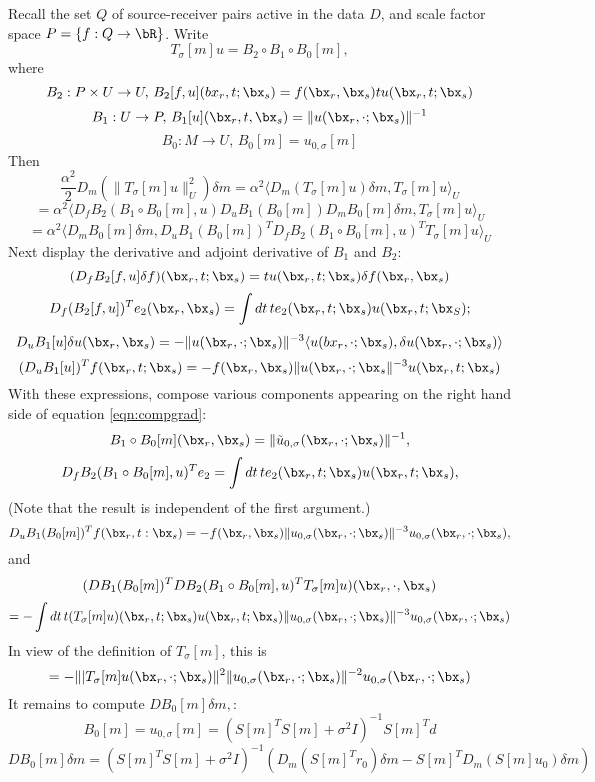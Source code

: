 Recall the set $Q$ of source-receiver pairs active in the data
$D$, and scale factor space $P = \{f:Q \rightarrow \bR\}$. Write
\[
  T_{\sigma}[m]u = B_2 \circ B_1 \circ B_0[m],
\]
where 
\[
B_2: P \times U \rightarrow U, \, B_2[f,u](bx_r,t;\bx_s) = f(\bx_r,\bx_s) tu(\bx_r,t;\bx_s)
\]
\[
B_1: U \rightarrow P, \,B_1[u](\bx_r,t,\bx_s) = \|u(\bx_r,\cdot; \bx_s)\|^{-1}
\]
\[
B_0: M \rightarrow U, \, B_0[m] = u_{0,\sigma}[m]
\]
Then
\[
 \frac{\alpha^2}{2} D_m(\|T_{\sigma}[m]u\|_U^2)\delta m = \alpha^2\langle D_m(
 T_{\sigma}[m]u)\delta m, T_{\sigma}[m]u \rangle_U
\]
\[
  =\alpha^2 \langle D_fB_2(B_1\circ B_0[m],u)D_uB_1(B_0[m]) D_mB_0[m]\delta m,
  T_{\sigma}[m]u\rangle_U
\]
\begin{equation}
  \label{eqn:compgrad}
  =\alpha^2 \langle D_mB_0[m]\delta m, D_uB_1(B_0[m])^TD_fB_2(B_1\circ
  B_0[m],u)^TT_{\sigma}[m]u\rangle_U
\end{equation}
Next display the derivative and adjoint derivative of $B_1$ and $B_2$:
$$
(D_fB_2[f,u]\delta f)(\bx_r,t;\bx_s) = tu(\bx_r,t;\bx_s)\delta f(\bx_r,\bx_s)
$$
$$
D_f(B_2[f,u])^Te_2(\bx_r,\bx_s) = \int dt\,te_2(\bx_r,t;\bx_s)u(\bx_r,t;\bx_S);
$$
$$
D_u B_1[u]\delta u(\bx_r,\bx_s) = -\|u(\bx_r,\cdot;\bx_s)\|^{-3}\langle u(bx_r,\cdot;\bx_s), \delta u(\bx_r,\cdot;\bx_s) \rangle
$$
$$
(D_u B_1[u])^Tf(\bx_r,t;\bx_s) =
-f(\bx_r,\bx_s)\|u(\bx_r,\cdot;\bx_s\|^{-3}u(\bx_r,t;\bx_s)
$$
With these expressions, compose various components appearing on the
right hand side of equation \ref{eqn:compgrad}:
\[
  B_1\circ B_0[m] (\bx_r,\bx_s) =  \|\tilde{u}_{0,\sigma}(\bx_r,\cdot; \bx_s)\|^{-1},
\]
\[
 D_fB_2(B_1\circ B_0[m],u)^Te_2 = \int dt\,te_2(\bx_r,t;\bx_s)u(\bx_r,t;\bx_s),
\]
(Note that the result is independent of the first argument.)
\[
D_uB_1(B_0[m])^Tf(\bx_r,t:\bx_s)=
-f(\bx_r,\bx_s)\|u_{0,\sigma}(\bx_r,\cdot;\bx_s)\|^{-3}u_{0,\sigma}(\bx_r,\cdot;\bx_s),
\]
and
\[
  (DB_1(B_0[m])^TDB_2(B_1\circ  B_0[m],u)^TT_{\sigma}[m]u )(\bx_r,\cdot,\bx_s)
\]
\[
  = -\int dt\,t(T_{\sigma}[m]u)(\bx_r,t;\bx_s)u(\bx_r,t;\bx_s)
  \|u_{0,\sigma}(\bx_r,\cdot;\bx_s)\|^{-3}u_{0,\sigma}(\bx_r,\cdot;\bx_s)
\]
In view of the definition of $T_{\sigma}[m]$, this is
\begin{equation}
  \label{eqn:compgrad1}
  = -\||T_{\sigma}[m]u(\bx_r,\cdot;\bx_s)\|^2
  \|u_{0,\sigma}(\bx_r,\cdot;\bx_s)\|^{-2}u_{0,\sigma}(\bx_r,\cdot;\bx_s)
\end{equation}
It remains to compute $ DB_0[m]\delta m,$:
$$
B_0[m] = u_{0,\sigma}[m] = (S[m]^TS[m] + \sigma^2 I)^{-1}S[m]^Td
$$
\begin{equation}
  \label{eqn:compgrad4}
  DB_0[m]\delta m = (S[m]^TS[m] + \sigma^2 I)^{-1}(D_m(S[m]^T r_0)\delta m - S[m]^TD_m(S[m]u_0)\delta m)
\end{equation}
